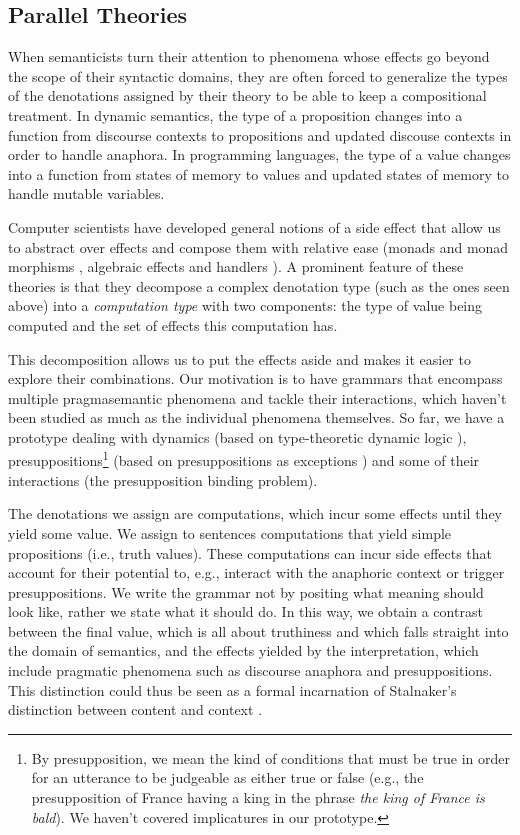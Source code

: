 \documentclass[a4paper,11pt,DIV=12]{scrartcl}
\begin{document}
\subsection{Parallel Theories}

When semanticists turn their attention to phenomena whose effects go beyond
the scope of their syntactic domains, they are often forced to generalize
the types of the denotations assigned by their theory to be able to keep a
compositional treatment. In dynamic semantics, the type of a proposition
changes into a function from discourse contexts to propositions and updated
discouse contexts in order to handle anaphora. In programming languages,
the type of a value changes into a function from states of memory to values
and updated states of memory to handle mutable variables.

Computer scientists have developed general notions of a side effect that
allow us to abstract over effects and compose them with relative ease
(monads and monad morphisms \cite{moggi1990abstract}, algebraic effects and
handlers \cite{plotkin2013handling}). A prominent feature of these theories
is that they decompose a complex denotation type (such as the ones seen
above) into a \emph{computation type} with two components: the type of
value being computed and the set of effects this computation has.

This decomposition allows us to put the effects aside and makes it easier
to explore their combinations. Our motivation is to have grammars that
encompass multiple pragmasemantic phenomena and tackle their interactions,
which haven't been studied as much as the individual phenomena themselves.
So far, we have a prototype dealing with dynamics (based on type-theoretic
dynamic logic \cite{de2006towards}), presuppositions\footnote{By
  presupposition, we mean the kind of conditions that must be true in order
  for an utterance to be judgeable as either true or false (e.g., the
  presupposition of France having a king in the phrase \emph{the king of
    France is bald}). We haven't covered implicatures in our prototype.}
(based on presuppositions as exceptions \cite{lebedeva2012expression}) and
some of their interactions (the presupposition binding problem).

The denotations we assign are computations, which incur some effects until
they yield some value. We assign to sentences computations that yield
simple propositions (i.e., truth values). These computations can incur side
effects that account for their potential to, e.g., interact with the
anaphoric context or trigger presuppositions. We write the grammar not by
positing what meaning should look like, rather we state what it should
do. In this way, we obtain a contrast between the final value, which is all
about truthiness and which falls straight into the domain of semantics, and
the effects yielded by the interpretation, which include pragmatic
phenomena such as discourse anaphora and presuppositions. This distinction
could thus be seen as a formal incarnation of Stalnaker's distinction
between content and context \cite{stalnaker1974pragmatic}.



\end{document}
